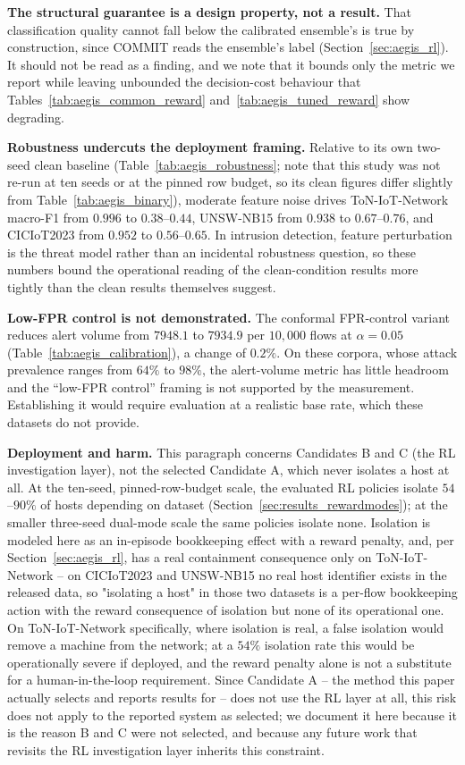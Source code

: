\documentclass[journal]{IEEEtran}
\begin{document}
\textbf{The structural guarantee is a design property, not a result.} That
classification quality cannot fall below the calibrated ensemble's is true by
construction, since COMMIT reads the ensemble's label
(Section~\ref{sec:aegis_rl}). It should not be read as a finding, and we note
that it bounds only the metric we report while leaving unbounded the
decision-cost behaviour that Tables~\ref{tab:aegis_common_reward}
and~\ref{tab:aegis_tuned_reward} show degrading.

\textbf{Robustness undercuts the deployment framing.} Relative to its own
two-seed clean baseline (Table~\ref{tab:aegis_robustness}; note that this
study was not re-run at ten seeds or at the pinned row budget, so its clean
figures differ slightly from Table~\ref{tab:aegis_binary}), moderate feature
noise drives ToN-IoT-Network macro-F1 from $0.996$ to $0.38$--$0.44$,
UNSW-NB15 from $0.938$ to $0.67$--$0.76$, and CICIoT2023 from $0.952$ to
$0.56$--$0.65$. In intrusion detection, feature perturbation is the threat
model rather than an incidental robustness question, so these numbers bound
the operational reading of the clean-condition results more tightly than the
clean results themselves suggest.

\textbf{Low-FPR control is not demonstrated.} The conformal FPR-control
variant reduces alert volume from $7948.1$ to $7934.9$ per $10{,}000$ flows
at $\alpha = 0.05$ (Table~\ref{tab:aegis_calibration}), a change of $0.2\%$.
On these corpora, whose attack prevalence ranges from $64\%$ to $98\%$, the
alert-volume metric has little headroom and the ``low-FPR control'' framing
is not supported by the measurement. Establishing it would require
evaluation at a realistic base rate, which these datasets do not provide.

\textbf{Deployment and harm.} This paragraph concerns Candidates B and C
(the RL investigation layer), not the selected Candidate A, which never
isolates a host at all. At the ten-seed, pinned-row-budget scale, the
evaluated RL policies isolate $54$--$90\%$ of hosts depending on dataset
(Section~\ref{sec:results_rewardmodes}); at the smaller three-seed dual-mode
scale the same policies isolate none. Isolation is modeled here as an
in-episode bookkeeping effect with a reward penalty, and, per
Section~\ref{sec:aegis_rl}, has a real containment consequence only on
ToN-IoT-Network -- on CICIoT2023 and UNSW-NB15 no real host identifier
exists in the released data, so "isolating a host" in those two datasets is
a per-flow bookkeeping action with the reward consequence of isolation but
none of its operational one. On ToN-IoT-Network specifically, where
isolation is real, a false isolation would remove a machine from the
network; at a $54\%$ isolation rate this would be operationally severe if
deployed, and the reward penalty alone is not a substitute for a
human-in-the-loop requirement. Since Candidate A -- the method this paper
actually selects and reports results for -- does not use the RL layer at
all, this risk does not apply to the reported system as selected; we
document it here because it is the reason B and C were not selected, and
because any future work that revisits the RL investigation layer inherits
this constraint.
\end{document}
